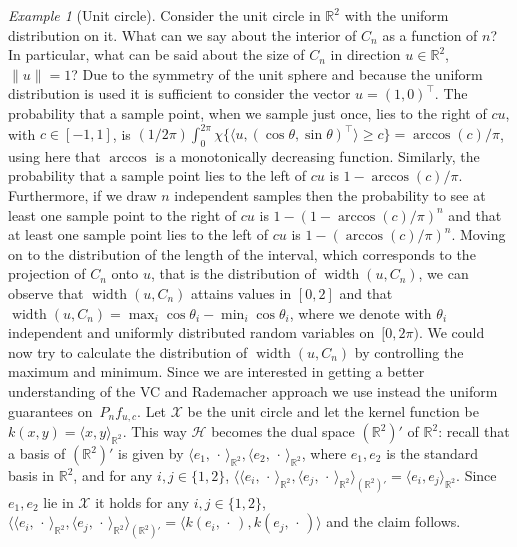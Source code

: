 \documentclass[10pt]{amsart}
\theoremstyle{definition}\newtheorem{defi}[theo]{Definition}\newtheorem{rema}[theo]{Remark}\newtheorem{exam}[theo]{Example}\newtheorem{exem}[theo]{Example}\newtheorem{nota}[theo]{Notation}
\theoremstyle{remark}
\newtheorem{examl}{Example}
\DeclareMathOperator{\diam}{width}
\newcommand{\R}{\mathbb{R}}
\newcommand{\X}{\mathcal{X}}
\newcommand{\cH}{\mathcal{H}}
\begin{document}
\begin{examl}[{Unit circle}]\label{sec:Example1}
Consider the unit circle in $\R^2$ with the uniform distribution on it. What can we say about the interior of $C_n$ as a function of $n$? In particular, what can be said about the size of $C_n$ in direction $u \in \R^2$, $\|u\|=1$? Due to the symmetry of the unit sphere and because the uniform distribution is used it is sufficient to consider the vector $u = (1, 0)^\top$. The probability that a sample point, when we sample just once, lies to the right of $c u$, with $c \in [-1,1]$, is $(1/2\pi) \int_0^{2\pi} \chi\{ \langle u, (\cos \theta, \sin \theta)^\top \rangle \geq c\} = \arccos(c)/\pi$, using here that $\arccos$ is a monotonically decreasing function. Similarly, the probability that a sample point lies to the left of $c u$ is $1-\arccos(c)/\pi$. Furthermore, if we draw $n$ independent samples then the probability to see at least one sample point to the right of $c u$ is $1 - (1-\arccos(c)/\pi)^n$ and that at least one sample point lies to the left of $c u$ is $1 - (\arccos(c)/\pi)^n$. Moving on to the distribution of the length of the interval, which corresponds to the projection of $C_n$ onto $u$, that is the distribution of $\diam(u,C_n)$, we can observe that $\diam(u,C_n)$ attains values in $[0,2]$ and that $\diam(u,C_n) = \max_i \cos \theta_i - \min_i \cos \theta_i$, where we denote with $\theta_i$ independent and uniformly distributed random variables on~$[0,2\pi)$. We could now try to calculate the distribution of $\diam(u,C_n)$ by controlling the maximum and minimum. Since we are interested in getting a better understanding of the VC and Rademacher approach we use instead the uniform guarantees on~$P_n f_{u,c}$. Let $\X$ be the unit circle and let the kernel function be $k(x,y) = \langle x, y \rangle_{\R^2}$. This way $\cH$ becomes the dual space $(\R^2)'$ of $\R^2$: recall that a basis of $(\R^2)'$ is given by $\langle e_1, \,\cdot\,\rangle_{\R^2}, \langle e_2,\,\cdot\, \rangle_{\R^2}$, where $e_1,e_2$ is the standard basis in $\R^2$, and for any $i,j\in\{1,2\}$, $\langle \langle e_i, \,\cdot\, \rangle_{\R^2}, \langle e_j, \,\cdot\, \rangle_{\R^2} \rangle_{(\R^2)'} = \langle e_i,e_j \rangle_{\R^2}$. Since $e_1,e_2$ lie in $\X$ it holds for any $i,j \in \{1,2\}$, $\langle \langle e_i, \,\cdot\, \rangle_{\R^2}, \langle e_j, \,\cdot\, \rangle_{\R^2} \rangle_{(\R^2)'} = \langle k(e_i,\,\cdot\,), k(e_j,\,\cdot\,) \rangle$ and the claim follows.



\end{examl}
\end{document}
